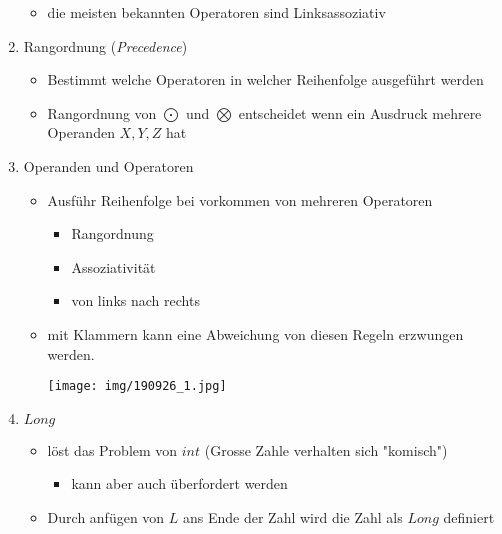 \documentclass[11pt]{article}
\begin{document}
\begin{enumerate}
\begin{itemize}
\item die meisten bekannten Operatoren sind Linksassoziativ\\
\end{itemize}

\item Rangordnung (\emph{Precedence})
\label{sec:org620938c}
\begin{itemize}
\item Bestimmt welche Operatoren in welcher Reihenfolge ausgeführt werden\\
\item Rangordnung von \(\bigodot\) und \(\bigotimes\) entscheidet wenn ein Ausdruck mehrere Operanden \(X, Y, Z\) hat\\
\end{itemize}

\item Operanden und Operatoren
\label{sec:org45949fc}
\begin{itemize}
\item Ausführ Reihenfolge bei vorkommen von mehreren Operatoren\\
\begin{itemize}
\item Rangordnung\\
\item Assoziativität\\
\item von links nach rechts\\
\end{itemize}

\item mit Klammern kann eine Abweichung von diesen Regeln erzwungen werden.\\
\begin{center}
\texttt{[image: img/190926\_1.jpg]}
\end{center}
\end{itemize}

\item \(Long\)
\label{sec:org4dfda6d}
\begin{itemize}
\item löst das Problem von \(int\) (Grosse Zahle verhalten sich "komisch")\\
\begin{itemize}
\item kann aber auch überfordert werden\\
\end{itemize}
\item Durch anfügen von \(L\) ans Ende der Zahl wird die Zahl als \(Long\) definiert\\
\end{itemize}


\end{enumerate}
\end{document}
